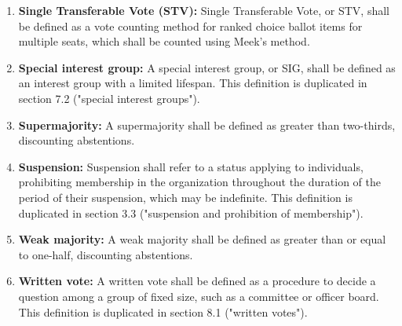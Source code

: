 \documentclass[11pt]{article}
\newcounter{h1}
\newcounter{h2}[h1]
\newcounter{h3}[h2]
\begin{document}
\begin{enumerate}
\begin{enumerate}
          \item \textbf{Supermajority resolution:} A supermajority resolution shall be defined as a resolution which may be passed only by a supermajority formal vote ballot item.
        \end{enumerate}
  \item \textbf{Single Transferable Vote (STV):} Single Transferable Vote, or STV, shall be defined as a vote counting method for ranked choice ballot items for multiple seats, which shall be counted using Meek's method.
  \item \textbf{Special interest group:} A special interest group, or SIG, shall be defined as an interest group with a limited lifespan. This definition is duplicated in section 7.2 ("special interest groups").
  \item \textbf{Supermajority:} A supermajority shall be defined as greater than two-thirds, discounting abstentions.
  \item \textbf{Suspension:} Suspension shall refer to a status applying to individuals, prohibiting membership in the organization throughout the duration of the period of their suspension, which may be indefinite. This definition is duplicated in section 3.3 ("suspension and prohibition of membership").
  \item \textbf{Weak majority:} A weak majority shall be defined as greater than or equal to one-half, discounting abstentions.
  \item \textbf{Written vote:} A written vote shall be defined as a procedure to decide a question among a group of fixed size, such as a committee or officer board. This definition is duplicated in section 8.1 ("written votes").
\end{enumerate}











\end{document}
